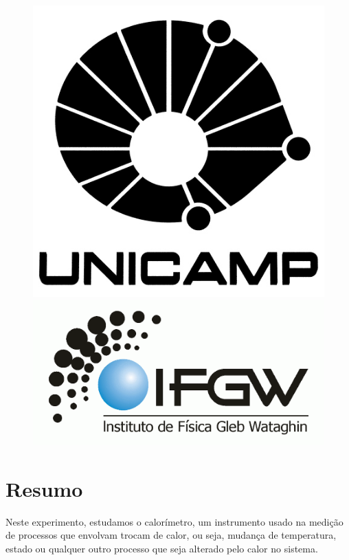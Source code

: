 \documentclass[a4paper]{article}
\begin{document}
\begin{figure}[!ht]
	\begin{minipage}[b]{0.45\linewidth}
		\includegraphics[scale=0.25]{logo-unicamp-name-line-blk-blk-0480.jpg}
	\end{minipage}
	\hspace{0.5cm}
	\begin{minipage}[b]{0.45\linewidth}
		\includegraphics[scale=0.25]{logo-ifgw.png}
	\end{minipage}
\end{figure}

\newpage{}

\section{Resumo}
	Neste experimento, estudamos o calorímetro, um instrumento usado na medição de processos que envolvam trocam de calor, ou seja, mudança de temperatura, estado ou qualquer outro processo que seja alterado pelo calor no sistema. 
\end{document}
